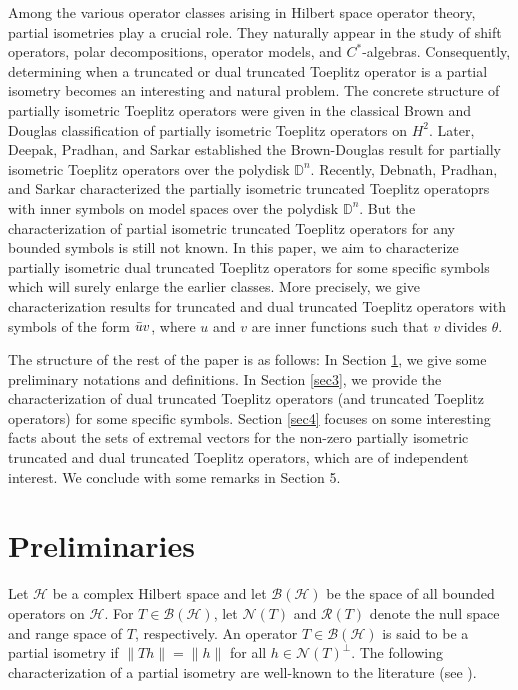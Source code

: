 \documentclass[12pt]{amsart}
\newcommand{\clb}{\mathcal{B}}
\newcommand{\clh}{\mathcal{H}}
\newcommand{\cln}{\mathcal{N}}
\newcommand{\clr}{\mathcal{R}}
\newcommand{\D}{\mathbb{D}}
\theoremstyle{definition}
\theoremstyle{plain}
\theoremstyle{definition}
\numberwithin{equation}{section}
\begin{document}
	
	
Among the various operator classes arising in Hilbert space operator theory, partial isometries play a crucial role. They naturally appear in the study of shift operators, polar decompositions, operator models, and $C^*$-algebras. Consequently, determining when a truncated or dual truncated Toeplitz operator is a partial isometry becomes an interesting and natural problem. The concrete structure of partially isometric Toeplitz operators were given in the classical Brown and Douglas \cite{Brown_Douglas} classification of partially isometric Toeplitz operators on $H^2$. Later, Deepak, Pradhan, and Sarkar \cite{KD} established the Brown-Douglas result for partially isometric Toeplitz operators over the polydisk $\D^n$. Recently, Debnath, Pradhan, and Sarkar \cite{DEBNATH-PRADHAN-SARKAR} characterized the partially isometric truncated Toeplitz operatoprs with inner symbols on model spaces over the polydisk $\D^n$. But the characterization of partial isometric truncated Toeplitz operators for any bounded symbols is still not known. In this paper, we aim to characterize partially isometric dual truncated Toeplitz operators for some specific symbols which will surely enlarge the earlier classes. More precisely, we give characterization results for truncated and dual truncated Toeplitz operators with symbols of the form $\Bar{u}v$, where $u$ and $v$ are inner functions such that $v$ divides $\theta$.
	
	
The structure of the rest of the paper is as follows: In Section \ref{sec2}, we give some preliminary notations and definitions. In Section \ref{sec3}, we provide the characterization of dual truncated Toeplitz operators (and truncated Toeplitz operators) for some specific symbols. Section \ref{sec4} focuses on some interesting facts about the sets of extremal vectors for the non-zero partially isometric truncated and dual truncated Toeplitz operators, which are of independent interest. We conclude with some remarks in Section 5.
	
	
	
	
\section{Preliminaries}\label{sec2}
	
Let $\clh$ be a complex Hilbert space and let $\clb(\clh)$ be the space of all bounded operators on $\clh$. For $T \in \clb(\clh)$, let $\cln(T)$ and $\clr(T)$ denote the null space and range space of $T$, respectively. An operator $T \in \clb(\clh)$ is said to be a partial isometry if $\|T h\|=\|h\|$ for all $h \in \cln(T)^\perp$. The following characterization of a partial isometry are well-known to the literature (see \cite[Proposition 4.38]{RD}).
	
\end{document}
